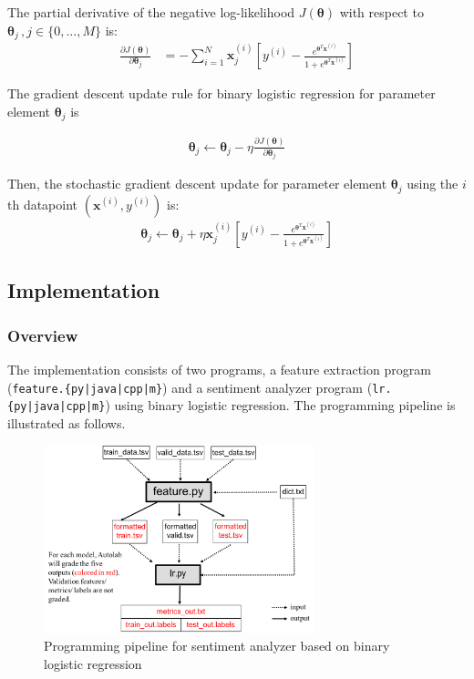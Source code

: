 \documentclass[11pt]{article}
\numberwithin{equation}{section} %
\numberwithin{figure}{section} %
\numberwithin{table}{section} %
\def\x{\mathbf x}
\newcommand{\thetav     }{\boldsymbol \theta     }
\begin{document}
The partial derivative of the negative log-likelihood $J(\thetav)$ with respect to $\thetav_j \,, j\in\{0,...,M\}$ is:
\begin{align}
    \frac{\partial J(\thetav)}{\partial \thetav_j} &= -\sum_{i=1}^N \x_j^{\left(i\right)}\left[y^{(i)}-\frac{e^{\thetav^T\x^{\left(i\right)}}}{1+e^{\thetav^T\x^{\left(i\right)}}}\right]
\end{align}


The gradient descent update rule  for binary logistic regression for parameter element $\thetav_j$ is

\begin{align}
    \thetav_j \leftarrow \thetav_j - \eta \frac{\partial J(\thetav)}{\partial \thetav_j}
\end{align}


Then, the stochastic gradient descent update for  parameter element $\thetav_j$ using the $i$th datapoint $(\x^{(i)},y^{(i)})$ is:
\begin{align}
    \thetav_j \leftarrow \thetav_j + \eta \x_j^{\left(i\right)}\left[y^{(i)}-\frac{e^{\thetav^T\x^{\left(i\right)}}}{1+e^{\thetav^T\x^{\left(i\right)}}}\right]
\end{align}
 


\subsection{Implementation}

\subsubsection{Overview}\label{overview}

The implementation consists of two programs, a feature extraction program (\texttt{feature.\{py|java|cpp|m\}}) and a sentiment analyzer program (\texttt{lr.\{py|java|cpp|m\}}) using binary logistic regression. The programming pipeline is illustrated as follows.

\begin{figure}[H]
        \centering
        \includegraphics[width = 0.7\textwidth]{Pipeline.png}
        \caption{Programming pipeline for sentiment analyzer based on binary logistic regression}
        \label{pipeline}
\end{figure}
\end{document}
